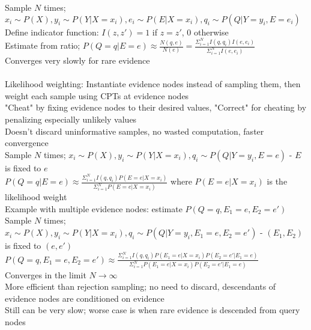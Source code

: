 \documentclass[10pt,letterpaper,unboxed,cm]{article}
\begin{document}
Sample $N$ times; $x_i \sim P(X), y_i \sim P(Y|X = x_i), e_i \sim P(E|X = x_i), q_i \sim P(Q|Y = y_i, E = e_i)$\\
Define indicator function: $I(z, z') = 1$ if $z = z'$, 0 otherwise\\
Estimate from ratio; $P(Q = q|E = e) \approx \frac{N(q,e)}{N(e)} = \frac{\Sigma^N_{i=1} I(q,q_i)I(e,e_i)}{\Sigma^N_{i=1} I(e,e_i)}$\\
Converges very slowly for rare evidence\\\\
Likelihood weighting: Instantiate evidence nodes instead of sampling them, then weight each sample using CPTs at evidence nodes\\
"Cheat" by fixing evidence nodes to their desired values, "Correct" for cheating by penalizing especially unlikely values\\
Doesn't discard uninformative samples, no wasted computation, faster convergence\\
Sample $N$ times; $x_i \sim P(X), y_i \sim P(Y|X = x_i), q_i \sim P(Q|Y = y_i, E = e)$ - $E$ is fixed to $e$\\
$P(Q = q|E = e) \approx \frac{\Sigma^N_{i=1} I(q,q_i)P(E = e|X = x_i)}{\Sigma^N_{i=1} P(E = e|X = x_i)}$ where $P(E = e|X = x_i)$ is the likelihood weight\\
Example with multiple evidence nodes: estimate $P(Q = q, E_1 = e, E_2 = e')$\\
Sample $N$ times; $x_i \sim P(X), y_i \sim P(Y|X = x_i), q_i \sim P(Q|Y = y_i, E_1 = e, E_2 = e')$ - $(E_1, E_2)$ is fixed to $(e, e')$\\
$P(Q = q, E_1 = e, E_2 = e') \approx \frac{\Sigma^N_{i=1} I(q,q_i)P(E_1 = e|X = x_i)P(E_2 = e'|E_1 = e)}{\Sigma^N_{i=1} P(E_1 = e|X = x_i)P(E_2 = e'|E_1 = e)}$\\
Converges in the limit $N \to \infty$\\
More efficient than rejection sampling; no need to discard, descendants of evidence nodes are conditioned on evidence\\
Still can be very slow; worse case is when rare evidence is descended from query nodes\\
\end{document}
